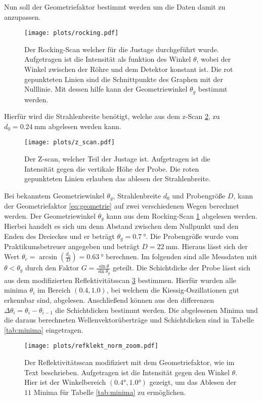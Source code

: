 Nun soll der Geometriefaktor bestimmt werden um die Daten damit zu anzupassen.
\begin{figure}
    \centering 
    \texttt{[image: plots/rocking.pdf]}
    \caption{Der Rocking-Scan welcher für die Justage durchgeführt wurde. Aufgetragen ist die Intensität als funktion des Winkel $\theta$, wobei der Winkel zwischen der Röhre und dem Detektor konstant ist. Die rot gepunkteten Linien sind die Schnittpunkte des Graphen mit der Nulllinie. Mit dessen hilfe kann der Geometriewinkel $\theta_g$ bestimmt werden.}
    \label{fig:Dreieck}
\end{figure}
Hierfür wird die Strahlenbreite benötigt, welche aus dem z-Scan \ref{fig:zScan}, zu $d_0 = \SI{0.24}{\milli\meter}$ abgelesen werden kann.
\begin{figure}
    \centering 
    \texttt{[image: plots/z\_scan.pdf]}
    \caption{Der Z-scan, welcher Teil der Justage ist. Aufgetragen ist die Intensität gegen die vertikale Höhe der Probe. Die roten gepunkteten Linien erlauben das ablesen der Strahlenbreite. }
    \label{fig:zScan}
\end{figure}
Bei bekanntem Geometriewinkel $\theta_g$, Strahlenbreite $d_0$ und Probengröße $D$, kann der Geometriefaktor \ref{eq:geometrie} auf zwei verschiedenen Wegen berechnet werden.
Der Geometriewinkel $\theta_g$ kann aus dem Rocking-Scan \ref{fig:Dreieck} abgelesen werden. Hierbei handelt es sich um denn Abstand zwischen dem Nullpunkt und den Enden des Dreieckes und er beträgt $\theta_g = \SI{0.7}{\degree}$.
Die Probengröße wurde vom Praktikumsbetreuer angegeben und beträgt $D = \SI{22}{\mm} $.
Hieraus lässt sich der Wert $\theta_c = \arcsin\left(\frac{d_0}{D}  \right) =\SI{0.63}{\degree} $ berechnen.
Im folgenden sind alle Messdaten mit $\theta < \theta_g$ durch den Faktor $G = \frac{\sin\theta }{\sin\theta_g}$ geteilt.
Die Schichtdicke der Probe lässt sich aus dem modifizierten Reflektivitätsscan \ref{fig:reflekt_norm} bestimmen. Hierfür wurden alle minima $\theta_i$ im Bereich $(0.4,1.0)$, bei welchem die Kiessig-Oszillationen  gut erkennbar sind, abgelesen.
Anschließend können aus den differenzen $\Delta \theta_i = \theta_i - \theta_{i-1}$ die Schichtdicken bestimmt werden. Die abgelesenen Minima und die daraus berechneten Wellenvektorüberträge und Schichtdicken sind in Tabelle \ref{tab:minima} eingetragen.
\begin{figure}
    \centering
        \texttt{[image: plots/refklekt\_norm\_zoom.pdf]}
    \caption{Der Reflektivitätsscan modifiziert mit dem Geometriefaktor, wie im Text beschrieben. Aufgetragen ist die Intensität gegen den Winkel $\theta$. Hier ist der Winkelbereich $(0.4°,1.0°)$ gezeigt, um das Ablesen der $11$ Minima für Tabelle \ref{tab:minima} zu ermöglichen.  }
    \label{fig:reflekt_norm}
\end{figure}
